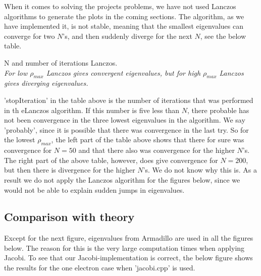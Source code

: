 \documentclass{article}
\begin{document}
When it comes to solving the projects problems, we have not used Lanczos algorithms to generate the plots in the coming sections. The algorithm, as we have implemented it, is not stable, meaning that the smallest eigenvalues can converge for two $N$'s, and then suddenly diverge for the next $N$, see the below table.

\begin{table}[H]
	\begin{minipage}{.49\textwidth} %
		
	\end{minipage}\hfill
	\begin{minipage}{.49\textwidth} %
		
	\end{minipage}\hfill
	\caption{N and number of iterations Lanczos.\\
	\textit{For low $\rho_{max}$ Lanczos gives convergent eigenvalues, but for high $\rho_{max}$ Lanczos gives diverging eigenvalues.}}
	\label{table: logErrors}
\end{table}

'stopIteration' in the table above is the number of iterations that was performed in th eLanczos algorithm. If this number is five less than $N$, there probable has not been convergence in the three lowest eigenvalues in the algorithm. We say 'probably', since it is possible that there was convergence in the last try. So for the lowest $\rho_{max}$, the left part of the table above shows that there for sure was convergence for $N=50$ and that there also was convergence for the higher $N$'s. \\

The right part of the above table, however, does give convergence for $N=200$, but then there is divergence for the higher $N$'s. We do not know why this is. As a result we do not apply the Lanczos algorithm for the figures below, since we would not be able to explain sudden jumps in eigenvalues.

\subsection{Comparison with theory}
Except for the next figure, eigenvalues from Armadillo are used in all the figures below. The reason for this is the very large computation times when applying Jacobi. To see that our Jacobi-implementation is correct, the below figure shows the results for the one electron case when 'jacobi.cpp' is used.
\end{document}
